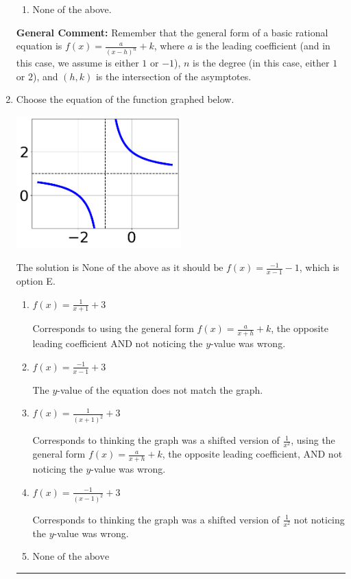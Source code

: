 \documentclass{extbook}[14pt]
\newcommand{\litem}[1]{\item #1

\rule{\textwidth}{0.4pt}}
\begin{document}
\begin{enumerate}
{\begin{enumerate}[label=\Alph*.]
\begin{multicols}{2}
\end{multicols}\item None of the above.\end{enumerate}
\textbf{General Comment:} Remember that the general form of a basic rational equation is $ f(x) = \frac{a}{(x-h)^n} + k$, where $a$ is the leading coefficient (and in this case, we assume is either $1$ or $-1$), $n$ is the degree (in this case, either $1$ or $2$), and $(h, k)$ is the intersection of the asymptotes.
}
\litem{
Choose the equation of the function graphed below.

\begin{center}
    \includegraphics[width=0.5\textwidth]{../Figures/rationalGraphToEquationCopyC.png}
\end{center}


The solution is \( \text{None of the above as it should be } f(x) = \frac{-1}{x - 1} - 1 \), which is option E.\begin{enumerate}[label=\Alph*.]
\item \( f(x) = \frac{1}{x + 1} + 3 \)

Corresponds to using the general form $f(x) = \frac{a}{x+h}+k$, the opposite leading coefficient AND not noticing the $y$-value was wrong.
\item \( f(x) = \frac{-1}{x - 1} + 3 \)

The $y$-value of the equation does not match the graph.
\item \( f(x) = \frac{1}{(x + 1)^2} + 3 \)

Corresponds to thinking the graph was a shifted version of $\frac{1}{x^2}$, using the general form $f(x) = \frac{a}{x+h}+k$, the opposite leading coefficient, AND not noticing the $y$-value was wrong.
\item \( f(x) = \frac{-1}{(x - 1)^2} + 3 \)

Corresponds to thinking the graph was a shifted version of $\frac{1}{x^2}$ not noticing the $y$-value was wrong.
\item \( \text{None of the above} \)


\end{enumerate}}
\end{enumerate}
\end{document}
